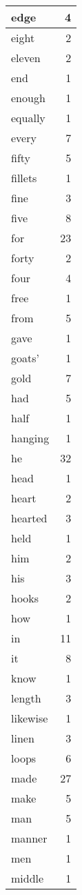 \begin{center}
\begin{longtable}{l|r}
edge & 4 \\ \hline
eight & 2 \\ \hline
eleven & 2 \\ \hline
end & 1 \\ \hline
enough & 1 \\ \hline
equally & 1 \\ \hline
every & 7 \\ \hline
fifty & 5 \\ \hline
fillets & 1 \\ \hline
fine & 3 \\ \hline
five & 8 \\ \hline
for & 23 \\ \hline
forty & 2 \\ \hline
four & 4 \\ \hline
free & 1 \\ \hline
from & 5 \\ \hline
gave & 1 \\ \hline
goats' & 1 \\ \hline
gold & 7 \\ \hline
had & 5 \\ \hline
half & 1 \\ \hline
hanging & 1 \\ \hline
he & 32 \\ \hline
head & 1 \\ \hline
heart & 2 \\ \hline
hearted & 3 \\ \hline
held & 1 \\ \hline
him & 2 \\ \hline
his & 3 \\ \hline
hooks & 2 \\ \hline
how & 1 \\ \hline
in & 11 \\ \hline
it & 8 \\ \hline
know & 1 \\ \hline
length & 3 \\ \hline
likewise & 1 \\ \hline
linen & 3 \\ \hline
loops & 6 \\ \hline
made & 27 \\ \hline
make & 5 \\ \hline
man & 5 \\ \hline
manner & 1 \\ \hline
men & 1 \\ \hline
middle & 1 \\ \hline

\end{longtable}
\end{center}

